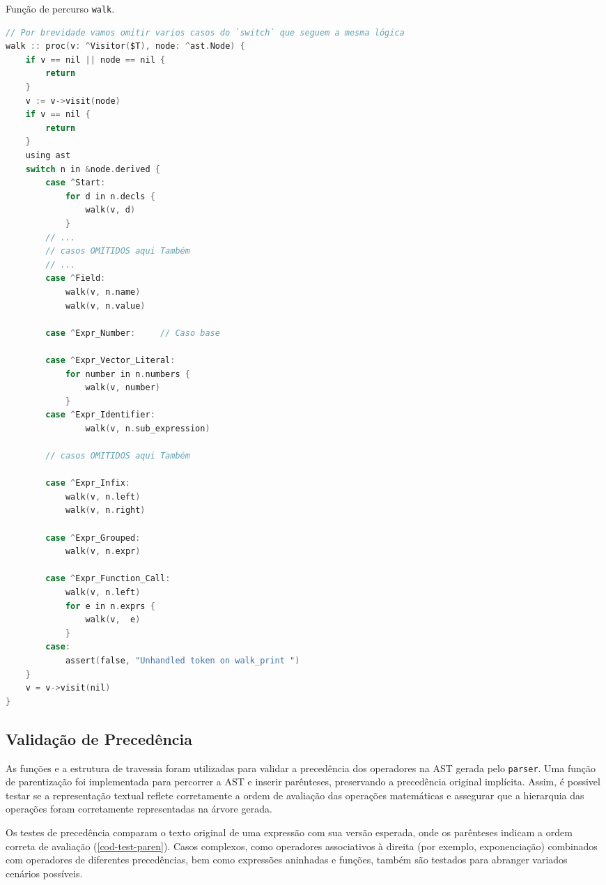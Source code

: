 \begin{codigo}[H]
\caption{\small Função de percurso \texttt{walk}. }
        \label{cod-visitor-walk}
\begin{lstlisting}[language = C, basicstyle=\ttfamily\footnotesize]
// Por brevidade vamos omitir varios casos do `switch` que seguem a mesma lógica
walk :: proc(v: ^Visitor($T), node: ^ast.Node) {
    if v == nil || node == nil {
        return
    }
    v := v->visit(node)
    if v == nil {
        return
    }
    using ast
    switch n in &node.derived {
        case ^Start:
            for d in n.decls {
                walk(v, d)
            }
        // ...
        // casos OMITIDOS aqui Também
        // ...
        case ^Field:
            walk(v, n.name)
            walk(v, n.value)

        case ^Expr_Number:     // Caso base

        case ^Expr_Vector_Literal:
            for number in n.numbers {
                walk(v, number)
            }
        case ^Expr_Identifier:
                walk(v, n.sub_expression)

        // casos OMITIDOS aqui Também

        case ^Expr_Infix:
            walk(v, n.left)
            walk(v, n.right)

        case ^Expr_Grouped:
            walk(v, n.expr)

        case ^Expr_Function_Call:
            walk(v, n.left)
            for e in n.exprs {
                walk(v,  e)
            }
        case:
            assert(false, "Unhandled token on walk_print ")
    }
    v = v->visit(nil)
}

  \end{lstlisting}
\end{codigo}


\subsection{Validação de Precedência}
As funções e a estrutura de travessia foram utilizadas para validar a precedência dos operadores na AST gerada pelo \texttt{parser}. Uma função de parentização foi implementada para percorrer a AST e inserir parênteses, preservando a precedência original implícita. Assim, é possivel testar se a representação textual reflete corretamente a ordem de avaliação das operações matemáticas e assegurar que a hierarquia das operações foram corretamente representadas na árvore gerada.

Os testes de precedência comparam o texto original de uma expressão com sua versão esperada, onde os parênteses indicam a ordem correta de avaliação (\autoref{cod-test-paren}). Casos complexos, como operadores associativos à direita (por exemplo, exponenciação) combinados com operadores de diferentes precedências, bem como expressões aninhadas e funções, também são testados para abranger variados cenários possíveis.


